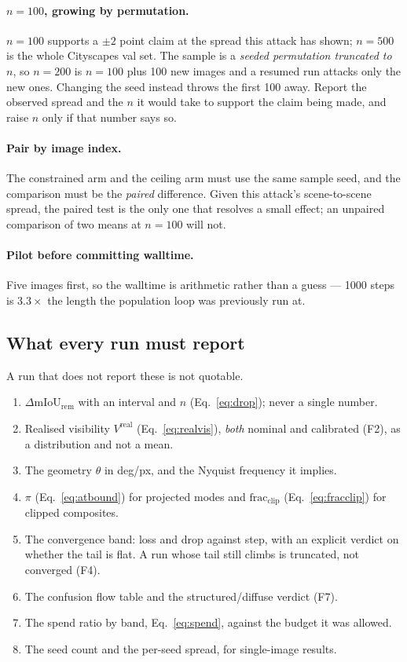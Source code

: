 \documentclass[11pt,a4paper]{article}
\begin{document}
\paragraph{$n=100$, growing by permutation.}
$n=100$ supports a $\pm2$ point claim at the spread this attack has shown;
$n=500$ is the whole Cityscapes val set. The sample is a \emph{seeded
permutation truncated to $n$}, so $n=200$ is $n=100$ plus 100 new images and
a resumed run attacks only the new ones. Changing the seed instead throws
the first 100 away. Report the observed spread and the $n$ it would take to
support the claim being made, and raise $n$ only if that number says so.

\paragraph{Pair by image index.}
The constrained arm and the ceiling arm must use the same sample seed, and
the comparison must be the \emph{paired} difference. Given this attack's
scene-to-scene spread, the paired test is the only one that resolves a small
effect; an unpaired comparison of two means at $n=100$ will not.

\paragraph{Pilot before committing walltime.}
Five images first, so the walltime is arithmetic rather than a guess ---
1000 steps is $3.3\times$ the length the population loop was previously run
at.

\subsection{What every run must report}

A run that does not report these is not quotable.
\begin{enumerate}
\item $\Delta\mathrm{mIoU}_{\mathrm{rem}}$ with an interval and $n$
  (Eq.~\eqref{eq:drop}); never a single number.
\item Realised visibility $V^{\mathrm{real}}$ (Eq.~\eqref{eq:realvis}),
  \emph{both} nominal and calibrated (F2), as a distribution and not a mean.
\item The geometry $\theta$ in deg/px, and the Nyquist frequency it implies.
\item $\pi$ (Eq.~\eqref{eq:atbound}) for projected modes and
  $\mathrm{frac_{clip}}$ (Eq.~\eqref{eq:fracclip}) for clipped composites.
\item The convergence band: loss and drop against step, with an explicit
  verdict on whether the tail is flat. A run whose tail still climbs is
  truncated, not converged (F4).
\item The confusion flow table and the structured/diffuse verdict (F7).
\item The spend ratio by band, Eq.~\eqref{eq:spend}, against the budget it
  was allowed.
\item The seed count and the per-seed spread, for single-image results.
\end{enumerate}
\end{document}
